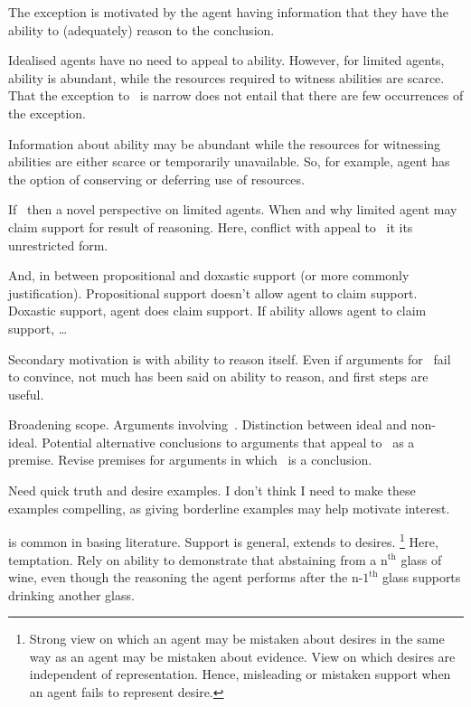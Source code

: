 \begin{note}[Ability]
  The exception is motivated by the agent having information that they have the ability to (adequately) reason to the conclusion.

  Idealised agents have no need to appeal to ability.
  However, for limited agents, ability is abundant, while the resources required to witness abilities are scarce.
  That the exception to~\uRa{} is narrow does not entail that there are few occurrences of the exception.

  Information about ability may be abundant while the resources for witnessing abilities are either scarce or temporarily unavailable.
  So, for example, agent has the option of conserving or deferring use of resources.

  If~\rC{} then a novel perspective on limited agents.
  When and why limited agent may claim support for result of reasoning.
  Here, conflict with appeal to~\uRa{} it its unrestricted form.

  And, in between propositional and doxastic support (or more commonly justification).
  Propositional support doesn't allow agent to claim support.
  Doxastic support, agent does claim support.
  If ability allows agent to claim support, \dots

  Secondary motivation is with ability to reason itself.
  Even if arguments for~\rC{} fail to convince, not much has been said on ability to reason, and first steps are useful.
\end{note}

\begin{note}
  Broadening scope.
  Arguments involving~\uRa{}.
  Distinction between ideal and non-ideal.
  Potential alternative conclusions to arguments that appeal to~\uRa{} as a premise.
  Revise premises for arguments in which~\uRa{} is a conclusion.
\end{note}

\begin{note}[Examples]
  Need quick truth and desire examples.
  I don't think I need to make these examples compelling, as giving borderline examples may help motivate interest.

  \uRa{} is common in basing literature.
  Support is general, extends to desires.\nolinebreak
  \footnote{
    Strong view on which an agent may be mistaken about desires in the same way as an agent may be mistaken about evidence.
    View on which desires are independent of representation.
    Hence, misleading or mistaken support when an agent fails to represent desire.
  }
  Here, temptation.
  Rely on ability to demonstrate that abstaining from a \(\text{n}^{\text{th}}\) glass of wine, even though the reasoning the agent performs after the \(\text{n-1}^{\text{th}}\) glass supports drinking another glass.
\end{note}

